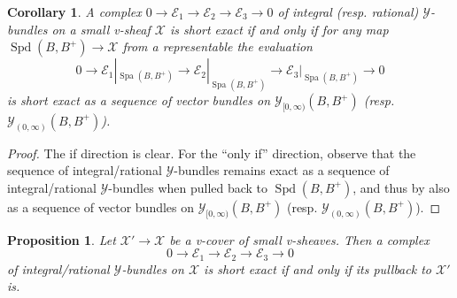 \documentclass[10pt,twoside]{article}
\numberwithin{equation}{section}
\theoremstyle{plain}
\newtheorem{myprop}[mythm]{Proposition}
\newtheorem{mycor}[mythm]{Corollary}
\theoremstyle{definition}
\DeclareMathOperator{\Spa}{Spa}
\DeclareMathOperator{\Spd}{Spd}
\newcommand{\MCE}{\mathcal{E}}
\newcommand{\MCX}{\mathcal{X}}
\newcommand{\MCY}{\mathcal{Y}}
\newcommand{\Yco}{\MCY_{[0,\infty)}}
\newcommand{\Yoo}{\MCY_{(0,\infty)}}
\begin{document}
\begin{mycor}\label{exactnessYBundleEquivalentDefinition}
    A complex \(0\to\MCE_1\to\MCE_2\to\MCE_3\to0\) of integral (resp. rational) \(\MCY\)-bundles on a small v-sheaf \(\MCX\) is short exact if and only if for any map \(\Spd(B,B^+)\to \MCX\) from a representable the evaluation
    \[0\longrightarrow\MCE_1|_{\Spa(B,B^+)}\longrightarrow\MCE_2|_{\Spa(B,B^+)}\longrightarrow\MCE_3|_{\Spa(B,B^+)}\longrightarrow0\]
    is short exact as a sequence of vector bundles on \(\Yco(B,B^+)\) (resp. \(\Yoo(B,B^+)\)).
\end{mycor}

\begin{proof}
    The if direction is clear. For the ``only if'' direction, observe that the sequence of integral/rational \(\MCY\)-bundles remains exact as a sequence of integral/rational \(\MCY\)-bundles when pulled back to \(\Spd(B,B^+)\), and thus by  also as a sequence of vector bundles on \(\Yco(B,B^+)\) (resp. \(\Yoo(B,B^+)\)).
\end{proof}






\begin{myprop}\label{exactnessIsVLocal}
    Let \(\MCX'\to \MCX\) be a v-cover of small v-sheaves. Then a complex
    \[0\longrightarrow\MCE_1\longrightarrow\MCE_2\longrightarrow\MCE_3\longrightarrow0\]
    of integral/rational \(\MCY\)-bundles on \(\MCX\) is short exact if and only if its pullback to \(\MCX'\) is.
\end{myprop}
\end{document}

